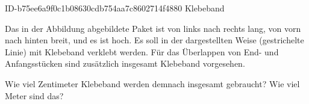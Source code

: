 \begin{exercise}
      {ID-b75ee6a9f0c1b08630cdb754aa7c8602714f4880}
      {Klebeband}
  \ifproblem\problem
    \begin{minipage}{0.33\linewidth}
    \end{minipage}\hfill
    \begin{minipage}{0.65\linewidth}
      Das in der Abbildung abgebildete Paket ist von links nach rechts 
      lang, von vorn nach hinten  breit, und es ist  hoch.
      Es soll in der dargestellten Weise (gestrichelte Linie) mit Klebeband
      verklebt werden. Für das Überlappen von End- und Anfangsstücken sind
      zusätzlich insgesamt  Klebeband vorgesehen.\par
      Wie viel Zentimeter Klebeband werden demnach insgesamt gebraucht?
      Wie viel Meter sind das?
    \end{minipage}
  \fi
\end{exercise}

